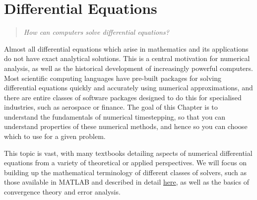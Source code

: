 \documentclass[
  letterpaper,
  DIV=11,
  numbers=noendperiod]{scrreprt}
\begin{document}

\chapter{Differential Equations}\label{differential-equations}

\begin{quote}
\emph{How can computers solve differential equations?}
\end{quote}

Almost all differential equations which arise in mathematics and its
applications do not have exact analytical solutions. This is a central
motivation for numerical analysis, as well as the historical development
of increasingly powerful computers. Most scientific computing languages
have pre-built packages for solving differential equations quickly and
accurately using numerical approximations, and there are entire classes
of software packages designed to do this for specialised industries,
such as aerospace or finance. The goal of this Chapter is to understand
the fundamentals of numerical timestepping, so that you can understand
properties of these numerical methods, and hence so you can choose which
to use for a given problem.

\begin{tcolorbox}[enhanced jigsaw, bottomrule=.15mm, colbacktitle=quarto-callout-note-color!10!white, breakable, arc=.35mm, coltitle=black, colback=white, bottomtitle=1mm, opacityback=0, title=\textcolor{quarto-callout-note-color}{\faInfo}\hspace{0.5em}{Note}, titlerule=0mm, toptitle=1mm, opacitybacktitle=0.6, colframe=quarto-callout-note-color-frame, leftrule=.75mm, rightrule=.15mm, left=2mm, toprule=.15mm]

This topic is vast, with many textbooks detailing aspects of numerical
differential equations from a variety of theoretical or applied
perspectives. We will focus on building up the mathematical terminology
of different classes of solvers, such as those available in MATLAB and
described in detail
\href{https://uk.mathworks.com/help/matlab/ordinary-differential-equations.html}{here},
as well as the basics of convergence theory and error analysis.

\end{tcolorbox}
\end{document}
